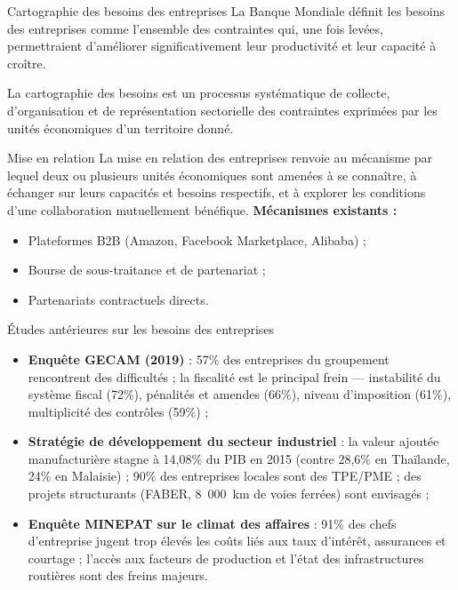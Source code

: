 \documentclass[aspectratio=169, 10pt]{beamer}
\begin{document}
\begin{frame}{Cartographie des besoins des entreprises}
    La Banque Mondiale définit les besoins des entreprises comme l'ensemble des contraintes qui, une fois levées, permettraient d'améliorer significativement leur productivité et leur capacité à croître.

    La cartographie des besoins est un processus systématique de collecte, d'organisation et de représentation sectorielle des contraintes exprimées par les unités économiques d'un territoire donné.
\end{frame}

\begin{frame}{Mise en relation}
    La mise en relation des entreprises renvoie au mécanisme par lequel deux ou plusieurs unités économiques sont amenées à se connaître, à échanger sur leurs capacités et besoins respectifs, et à explorer les conditions d'une collaboration mutuellement bénéfique.
    \vspace{4pt}
    \textbf{Mécanismes existants :}
    \begin{itemize}
        \item Plateformes B2B (Amazon, Facebook Marketplace, Alibaba) ;
        \item Bourse de sous-traitance et de partenariat ;
        \item Partenariats contractuels directs.
    \end{itemize}
\end{frame}

\begin{frame}{Études antérieures sur les besoins des entreprises}
    \begin{itemize}
        \item \textbf{Enquête GECAM (2019)} : 57\% des entreprises du groupement rencontrent des difficultés ; la fiscalité est le principal frein — instabilité du système fiscal (72\%), pénalités et amendes (66\%), niveau d'imposition (61\%), multiplicité des contrôles (59\%) ;
        \item \textbf{Stratégie de développement du secteur industriel} : la valeur ajoutée manufacturière stagne à 14,08\% du PIB en 2015 (contre 28,6\% en Thaïlande, 24\% en Malaisie) ; 90\% des entreprises locales sont des TPE/PME ; des projets structurants (FABER, 8~000~km de voies ferrées) sont envisagés ;
        \item \textbf{Enquête MINEPAT sur le climat des affaires} : 91\% des chefs d'entreprise jugent trop élevés les coûts liés aux taux d'intérêt, assurances et courtage ; l'accès aux facteurs de production et l'état des infrastructures routières sont des freins majeurs.
    \end{itemize}
\end{frame}
\end{document}
